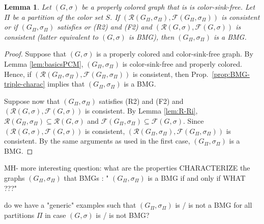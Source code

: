 \documentclass[final,3p,times]{elsarticle}
\newtheorem{lemma}[theorem]{Lemma}%
\newcommand{\TODO}[1]{\begingroup\color{red}#1\endgroup}
\begin{document}
\begin{lemma}
    Let $(G,\sigma)$ be a properly colored graph that is is color-sink-free. Let
    $\Pi$ be a partition of the color set $S$. If 
    $(\mathscr{R}(G_\Pi,\sigma_\Pi),
    \mathscr{F}(G_\Pi,\sigma_\Pi))$ is consistent or if 
    $(G_\Pi,\sigma_\Pi)$ 
    satisfies or (R2) and (F2) and $(\mathscr{R}(G,\sigma),
    \mathscr{F}(G,\sigma))$ is consistent (latter equivalent to $(G,\sigma)$  is BMG), 
    then $(G_\Pi,\sigma_\Pi)$ is a BMG. 
\end{lemma}
\begin{proof}
    Suppose that $(G,\sigma)$ is a properly colored and color-sink-free graph.
   By Lemma \ref{lem:basicsPCM}, $(G_\Pi,\sigma_\Pi)$ is color-sink-free and
   properly colored. Hence, if $(\mathscr{R}(G_\Pi,\sigma_\Pi),
   \mathscr{F}(G_\Pi,\sigma_\Pi))$ is consistent, then Prop.\
   \ref{prop:BMG-triple-charac} implies that $(G_\Pi,\sigma_\Pi)$ is a BMG. 
     
    Suppose now that $(G_\Pi,\sigma_\Pi)$ satisfies (R2) and (F2) and
    $(\mathscr{R}(G,\sigma), \mathscr{F}(G,\sigma))$ is consistent. By Lemma
    \ref{lem:R-Ri}, $\mathscr{R}(G_\Pi,\sigma_\Pi) \subseteq
    \mathscr{R}(G,\sigma)$ and $\mathscr{F}(G_\Pi,\sigma_\Pi) \subseteq
    \mathscr{F}(G,\sigma)$. Since $(\mathscr{R}(G,\sigma),
    \mathscr{F}(G,\sigma))$ is consistent, $(\mathscr{R}(G_\Pi,\sigma_\Pi)
    ,\mathscr{F}(G_\Pi,\sigma_\Pi) )$ is consistent. By the same arguments as
    used in the first case, $(G_\Pi,\sigma_\Pi)$ is a BMG. 
\end{proof}


\TODO{MH- more interesting question: what are the properties CHARACTERIZE the graphs $(G_\Pi,\sigma_\Pi)$ that BMGs :
	"	 $(G_\Pi,\sigma_\Pi)$ is a BMG if and	only if   WHAT ???"	
 }
 
\TODO{do we have a "generic" examples such that  $(G_\Pi,\sigma_\Pi)$ is / is not a BMG
for all partitions $\Pi$ in case $(G,\sigma)$ is / is not BMG? } 


\end{document}

